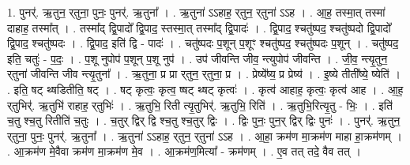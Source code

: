 \documentclass[17pt]{extarticle}
\begin{document}
1. पुनर्॑. ऋ॒तुन॒ र्‌तुना॒ पुनः॒ पुनर्॑. ऋ॒तुना᳚ । . ऋ॒तुना॑ ऽऽहाह॒ र्‌तुन॒ र्‌तुना॑ ऽऽह । . आ॒ह॒ तस्मा॒त् तस्मा॑ दाहाह॒ तस्मा᳚त् । . तस्मा᳚द् द्वि॒पादो᳚ द्वि॒पाद॒ स्तस्मा॒त् तस्मा᳚द् द्वि॒पादः॑ । . द्वि॒पाद॒ श्चतु॑ष्पद॒ श्चतु॑ष्पदो द्वि॒पादो᳚ द्वि॒पाद॒ श्चतु॑ष्पदः । . द्वि॒पाद॒ इति॑ द्वि - पादः॑ । . चतु॑ष्पदः प॒शून् प॒शूꣳ श्चतु॑ष्पद॒ श्चतु॑ष्पदः प॒शून् । . चतु॑ष्पद॒ इति॒ चतुः॑ - प॒दः॒ । . प॒शू नुपोप॑ प॒शून् प॒शू नुप॑ । . उप॑ जीवन्ति जीव॒ न्त्युपोप॑ जीवन्ति । . जी॒व॒ न्त्यृ॒तुन॒ र्‌तुना॑ जीवन्ति जीव न्त्यृ॒तुना᳚ । . ऋ॒तुना॒ प्र प्रा र्‌तुन॒ र्‌तुना॒ प्र । . प्रेष्ये᳚ष्य॒ प्र प्रेष्य॑ । . इ॒ष्ये तीती᳚ष्ये॒ ष्येति॑ । . इति॒ षट् थ्षडितीति॒ षट् । . षट् कृत्वः॒ कृत्व॒ ष्षट् थ्षट् कृत्वः॑ । . कृत्व॑ आहाह॒ कृत्वः॒ कृत्व॑ आह । . आ॒ह॒ र्‌तुभिर्॑. ऋ॒तुभि॑ राहाह॒ र्‌तुभिः॑ । . ऋ॒तुभि॒ रिती त्यृ॒तुभिर्॑. ऋ॒तुभि॒ रिति॑ । . ऋ॒तुभि॒रित्यृ॒तु - भिः॒ । . इति॑ च॒तु श्च॒तु रितीति॑ च॒तुः । . च॒तुर् द्विर् द्वि श्च॒तु श्च॒तुर् द्विः । . द्विः पुनः॒ पुन॒र् द्विर् द्विः पुनः॑ । . पुनर्॑. ऋ॒तुन॒ र्‌तुना॒ पुनः॒ पुनर्॑. ऋ॒तुना᳚ । . ऋ॒तुना॑ ऽऽहाह॒ र्‌तुन॒ र्‌तुना॑ ऽऽह । . आ॒हा॒ क्रम॑ण मा॒क्रम॑ण माहा हा॒क्रम॑णम् । . आ॒क्रम॑ण मे॒वैवा क्रम॑ण मा॒क्रम॑ण मे॒व । . आ॒क्रम॑ण॒मित्या᳚ - क्रम॑णम् । . ए॒व तत् तदे॒ वैव तत् । \newline
\end{document}

